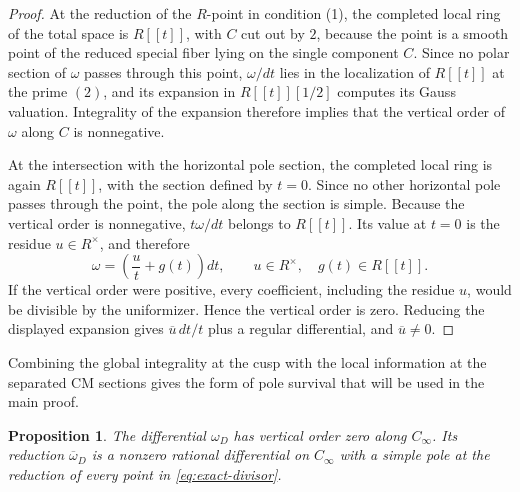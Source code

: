 \documentclass[11pt]{amsart}
\newtheorem{proposition}[theorem]{Proposition}
\theoremstyle{remark}
\numberwithin{equation}{section}
\begin{document}
\begin{proof}
 At the reduction of the $R$-point in condition (1), the completed local
 ring of the total space is $R[[t]]$, with $C$ cut out by $2$, because the
 point is a smooth point of the reduced special fiber lying on the single
 component $C$.  Since no polar section of $\omega$ passes through this
 point, $\omega/dt$ lies in the localization of $R[[t]]$ at the prime
 $(2)$, and its expansion in $R[[t]][1/2]$ computes its Gauss valuation.
 Integrality of the expansion therefore implies that the vertical order of
 $\omega$ along $C$ is nonnegative.

 At the intersection with the horizontal pole
 section, the completed local ring is again $R[[t]]$, with the section defined
 by $t=0$.  Since no other horizontal pole passes through the point, the pole
 along the section is simple.  Because the vertical order is nonnegative,
 $t\omega/dt$ belongs to $R[[t]]$.  Its value
 at $t=0$ is the residue $u\in R^\times$, and therefore
 \[
  \omega=\left(\frac{u}{t}+g(t)\right)dt,
  \qquad u\in R^\times,\quad g(t)\in R[[t]].
 \]
 If the vertical order were positive, every coefficient, including the
 residue $u$, would be divisible by the uniformizer.  Hence the vertical
 order is zero.  Reducing the displayed expansion gives
 $\overline u\,dt/t$ plus a regular differential, and
 $\overline u\neq0$.
\end{proof}

Combining the global integrality at the cusp with the local information at
the separated CM sections gives the form of pole survival that will be used
in the main proof.

\begin{proposition}\label{prop:reduced-poles}
 The differential $\omega_D$ has vertical order zero along $C_\infty$.
 Its reduction $\overline\omega_D$ is a nonzero rational differential on
 $C_\infty$ with a simple pole at the reduction of every point in
 \eqref{eq:exact-divisor}.
\end{proposition}
\end{document}
